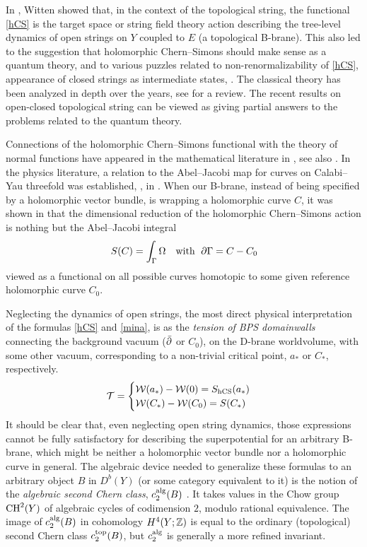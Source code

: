 In \cite{wcs}, Witten showed that, in the context of the topological
string, the functional \eqref{hCS} is the target space or string
field theory action describing the tree-level dynamics of open
strings on $Y$ coupled to $E$ (a topological B-brane). This also 
led to the suggestion that holomorphic Chern--Simons should make 
sense as a quantum theory, and to various puzzles related to 
non-renormalizability of \eqref{hCS}, appearance of closed strings 
as intermediate states, \etc. The classical theory has been analyzed 
in depth over the years, see \cite{calinreview} for a review. The 
recent results on open-closed topological string \cite{extended} 
can be viewed as giving partial answers to the problems related 
to the quantum theory.

Connections of the holomorphic Chern--Simons functional with the theory 
of normal functions have appeared in the mathematical literature in
\cite{doth,clemens2}, see also \cite{tyurin}. In the physics 
literature, a relation to the Abel--Jacobi map for curves on 
Calabi--Yau threefold was established, \eg, in 
\cite{vafaextend,kklm2,diva1,agva}. When our B-brane, instead 
of being specified by a holomorphic vector bundle, is wrapping a 
holomorphic curve $C$, it was shown in \cite{kklm2,diva1,agva} that 
the dimensional reduction of the holomorphic Chern--Simons action
is nothing but the Abel--Jacobi integral
\begin{equation}
\eqlabel{mina}
S(C) = \int_\Gamma \Omega \quad\text{with\; $\del\Gamma= C-C_0$}
\end{equation}
viewed as a functional on all possible curves homotopic to some given
reference holomorphic curve $C_0$.

Neglecting the dynamics of open strings, the most direct physical 
interpretation of the formulas \eqref{hCS} and \eqref{mina}, is as 
the {\it tension of BPS domainwalls} connecting the background 
vacuum ($\bar\partial$ or $C_0$), on the D-brane worldvolume, with some 
other vacuum, corresponding to a non-trivial critical point, $a_*$ 
or $C_*$, respectively.
\begin{equation}
\eqlabel{domainwall}
\calt = \begin{cases} \calw(a_*)-\calw(0) = S_{\rm hCS}(a_*) \\
\calw(C_*)-\calw(C_0) = S(C_*) 
\end{cases}
\end{equation}
It should be clear that, even neglecting open string dynamics, those 
expressions cannot be fully satisfactory for describing the superpotential
for an arbitrary B-brane, which might be neither a holomorphic
vector bundle nor a holomorphic curve in general. The algebraic 
device needed to generalize these formulas to an arbitrary object 
$B$ in $D^b(Y)$ (or some category equivalent to it) is the notion 
of the {\it algebraic second Chern class}, $c_2^{\rm alg}(B)$
\cite{MR0116023}. 
It takes values in the Chow group ${\mathop{\rm CH}}^2(Y)$ of algebraic cycles 
of codimension $2$, modulo rational equivalence. The image of 
$c_2^{\rm alg}(B)$ in cohomology $H^4(Y;{\mathbb Z})$ is equal to the ordinary 
(topological) second Chern class $c_2^{\rm top}(B)$, but $c_2^{\rm alg}$ 
is generally a more refined invariant. 

